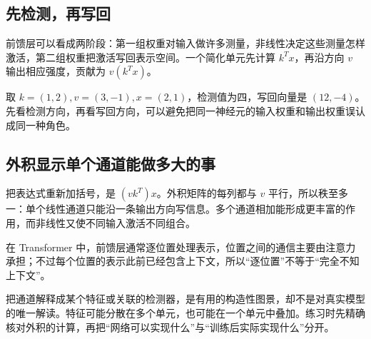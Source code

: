 \subsection*{先检测，再写回}
前馈层可以看成两阶段：第一组权重对输入做许多测量，非线性决定这些测量怎样激活，第二组权重把激活写回表示空间。一个简化单元先计算 $k^Tx$，再沿方向 $v$ 输出相应强度，贡献为 $v(k^Tx)$。

取 $k=(1,2),v=(3,-1),x=(2,1)$，检测值为四，写回向量是 $(12,-4)$。先看检测方向，再看写回方向，可以避免把同一神经元的输入权重和输出权重误认成同一种角色。

\subsection*{外积显示单个通道能做多大的事}
把表达式重新加括号，是 $(vk^T)x$。外积矩阵的每列都与 $v$ 平行，所以秩至多一：单个线性通道只能沿一条输出方向写信息。多个通道相加能形成更丰富的作用，而非线性又使不同输入激活不同组合。

在 Transformer 中，前馈层通常逐位置处理表示，位置之间的通信主要由注意力承担；不过每个位置的表示此前已经包含上下文，所以“逐位置”不等于“完全不知上下文”。

把通道解释成某个特征或关联的检测器，是有用的构造性图景，却不是对真实模型的唯一解读。特征可能分散在多个单元，也可能在一个单元中叠加。练习时先精确核对外积的计算，再把“网络可以实现什么”与“训练后实际实现什么”分开。
